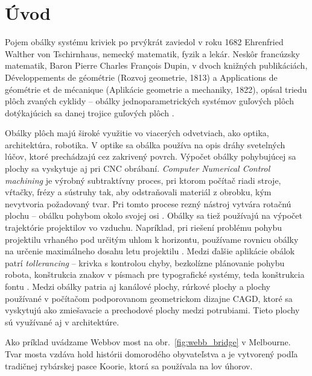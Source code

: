 \chapter*{Úvod} %
Pojem obálky systému kriviek po prvýkrát zaviedol v roku 1682 Ehrenfried Walther von Tschirnhaus, nemecký matematik, fyzik a lekár. Neskôr francúzsky matematik, Baron Pierre Charles François Dupin, v dvoch knižných publikáciách, Développements de géométrie (Rozvoj geometrie, 1813) a Applications de géométrie et de mécanique (Aplikácie geometrie a mechaniky, 1822), opísal triedu plôch zvaných cyklidy – obálky jednoparametrických systémov guľových plôch dotýkajúcich sa danej trojice guľových plôch \cite{Ciz2017}.

Obálky plôch majú široké využitie vo viacerých odvetviach, ako optika, architektúra, robotika. V optike sa obálka používa na opis dráhy svetelných lúčov, ktoré prechádzajú cez zakrivený povrch. Výpočet obálky pohybujúcej sa plochy sa vyskytuje aj pri CNC obrábaní. \textit{Computer Numerical Control machining} je výrobný subtraktívny proces, pri ktorom počítač riadi stroje, vŕtačky, frézy a sústruhy tak, aby odstraňovali materiál z obrobku, kým nevytvoria požadovaný tvar. Pri tomto procese rezný nástroj vytvára rotačnú plochu – obálku pohybom okolo svojej osi \cite{Skop20}. Obálky sa tiež používajú na výpočet trajektórie projektilov vo vzduchu. Napríklad, pri riešení problému pohybu projektilu vrhaného pod určitým uhlom k horizontu, používame rovnicu obálky na určenie maximálneho dosahu letu projektilu \cite{Chud09}. Medzi ďalšie aplikácie obálok patrí \textit{tollerancing} – krivka s kontrolou chyby, bezkolízne plánovanie pohybu robota, konštrukcia znakov v písmach pre typografické systémy, teda konštrukcia fontu \cite{Pott09}. Medzi obálky patria aj kanálové plochy, rúrkové plochy a plochy používané v počítačom podporovanom geometrickom dizajne CAGD, ktoré sa vyskytujú ako zmiešavacie a prechodové plochy medzi potrubiami. Tieto plochy sú využívané aj v architektúre.

Ako príklad uvádzame Webbov most na obr.~\ref{fig:webb_bridge} v Melbourne. Tvar mosta vzdáva hold histórii domorodého obyvateľstva a je vytvorený podľa tradičnej rybárskej pasce Koorie, ktorá sa používala na lov úhorov.

